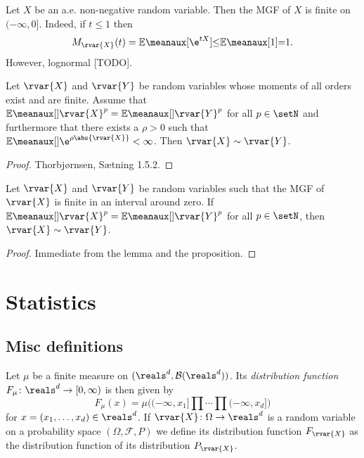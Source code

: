 \documentclass[article, a4paper, 11pt, oneside]{memoir}
\numberwithin{equation}{chapter}
\newcommand{\calF}{\mathcal{F}}
\newcommand{\borel}{\mathcal{B}}
\begin{document}
\begin{example}
    Let $X$ be an a.e. non-negative random variable. Then the MGF of $X$ is finite on $(-\infty, 0]$. Indeed, if $t \leq 1$ then
    \begin{equation*}
        M_{\rvar{X}}(t)
            = \mean[\e^{tX}]
            \leq \mean[1]
            = 1.
    \end{equation*}
    However, lognormal [TODO].
\end{example}


\begin{lemma}
    Let $\rvar{X}$ and $\rvar{Y}$ be random variables whose moments of all orders exist and are finite. Assume that $\mean{\rvar{X}^p} = \mean{\rvar{Y}^p}$ for all $p \in \setN$ and furthermore that there exists a $\rho > 0$ such that $\mean{\e^{\rho\abs{\rvar{X}}}} < \infty$. Then $\rvar{X} \sim \rvar{Y}$.
\end{lemma}

\begin{proof}
    Thorbjørnsen, Sætning 1.5.2.
\end{proof}


\begin{theorem}
    Let $\rvar{X}$ and $\rvar{Y}$ be random variables such that the MGF of $\rvar{X}$ is finite in an interval around zero. If $\mean{\rvar{X}^p} = \mean{\rvar{Y}^p}$ for all $p \in \setN$, then $\rvar{X} \sim \rvar{Y}$.
\end{theorem}

%
\begin{proof}
    Immediate from the lemma and the proposition.
\end{proof}



\chapter{Statistics}

\section{Misc definitions}

Let $\mu$ be a finite measure on $(\reals^d, \borel(\reals^d))$. Its \emph{distribution function} $F_\mu \colon \reals^d \to [0,\infty)$ is then given by
%
\begin{equation*}
    F_\mu(x)
        = \mu\bigl( (-\infty,x_1] \prod \cdots \prod (-\infty,x_d] \bigr)
\end{equation*}
%
for $x = (x_1, \ldots, x_d) \in \reals^d$. If $\rvar{X} \colon \Omega \to \reals^d$ is a random variable on a probability space $(\Omega,\calF,P)$ we define its distribution function $F_{\rvar{X}}$ as the distribution function of its distribution $P_{\rvar{X}}$.
\end{document}
